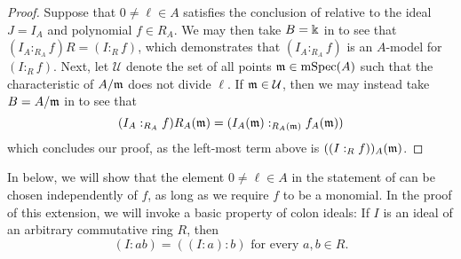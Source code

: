 \documentclass{amsart}
\begin{document}
\begin{proof}
Suppose that $0 \neq \ell \in A$ satisfies the conclusion of  relative to the ideal $J=I_A$ and polynomial $f \in R_A$.  We may then take $B=\Bbbk$ in  to see that $(I_A:_{R_A} f)R = (I :_{R} f)$, which demonstrates that $(I_A :_{R_A} f)$ is an $A$-model for $(I :_R f)$.  Next, let $\mathcal{U}$ denote the set of all points $\mathfrak{m} \in \operatorname{mSpec}(A)$ such that the characteristic of $A/\mathfrak{m}$ does not divide $\ell$.  If $\mathfrak{m} \in \mathcal{U}$, then we may instead take $B=A/\mathfrak{m}$ in  to see that
\[  (I_A:_{R_A} f)R_A(\mathfrak{m}) = (I_A(\mathfrak{m}) :_{R_A(\mathfrak{m})} f_A(\mathfrak{m})) \]
which concludes our proof, as the left-most term above is $((I :_R f))_A(\mathfrak{m})$.
\end{proof}

In  below, we will show that the element $0 \neq \ell \in A$ in the statement of  can be chosen independently of $f$, as long as we require $f$ to be a monomial.   In the proof of this extension, we will invoke a basic property of colon ideals:  If $I$ is an ideal of an arbitrary commutative ring $R$, then
\begin{equation}
\label{iterated colon: e}
 (I: ab) = ((I: a): b) \text{ for every } a,b \in R.
\end{equation}


\end{document}
